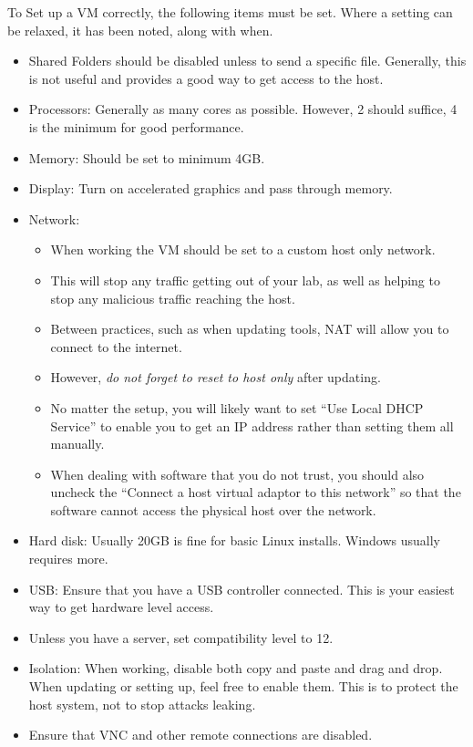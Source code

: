 				To Set up a VM correctly, the following items must be set.
				Where a setting can be relaxed, it has been noted, along with when.
				\begin{itemize}
					\item Shared Folders should be disabled unless to send a specific file.
						Generally, this is not useful and provides a good way to get access to the host.
					\item Processors: Generally as many cores as possible. However, 2 should suffice, 4 is the minimum for good performance.
					\item Memory: Should be set to minimum 4GB.
					\item Display: Turn on accelerated graphics and pass through memory.
					\item Network:
						\begin{itemize}
							\item When working the VM should be set to a custom host only network.
							\item This will stop any traffic getting out of your lab, as well as helping to stop any malicious traffic reaching the host.
							\item Between practices, such as when updating tools, NAT will allow you to connect to the internet.
							\item However, \emph{do not forget to reset to host only} after updating.
							\item No matter the setup, you will likely want to set ``Use Local DHCP Service'' to enable you to get an IP address rather than setting them all manually.
							\item When dealing with software that you do not trust, you should also uncheck the ``Connect a host virtual adaptor to this network'' so that the software cannot access the physical host over the network.
						\end{itemize}
					\item Hard disk: Usually 20GB is fine for basic Linux installs.
						Windows usually requires more.
					\item USB: Ensure that you have a USB controller connected.
						This is your easiest way to get hardware level access.
					\item Unless you have a server, set compatibility level to 12.
					\item Isolation: When working, disable both copy and paste and drag and drop.
						When updating or setting up, feel free to enable them.
						This is to protect the host system, not to stop attacks leaking.
					\item Ensure that VNC and other remote connections are disabled.
				\end{itemize}
